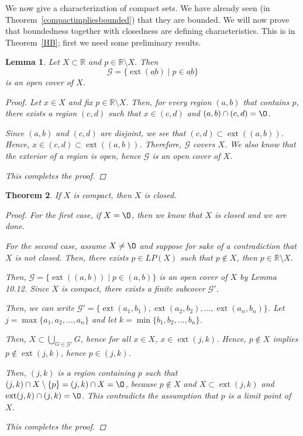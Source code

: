 \documentclass[11pt]{article}
\newcommand{\bbR}{\mathbb{R}}
\renewcommand{\emptyset}{\O}
\renewcommand{\_}[1]{\underline{ #1 }}
\DeclareMathOperator{\ext}{ext}
\newtheorem{theorem}{Theorem}[section]
\newtheorem{lemma}[theorem]{Lemma}
\theoremstyle{definition}
\numberwithin{equation}{subsection}
\begin{document}
  We now give a characterization of compact sets. We have already seen (in Theorem~\ref{compactimpliesbounded}) that they are bounded. We will now prove that boundedness together with closedness are defining characteristics. This is in Theorem~\ref{HB}; first we need some preliminary results. 

\begin{lemma}   Let $X\subset \bbR$ and $p\in \bbR\setminus X.$ Then
\[
\mathcal{G} = \{ \ext(\_{ab}) \mid p\in \_{ab}  \}
\]
is an open cover of $X.$ 

\begin{proof}
Let $x \in X$ and fix $p \in \bbR \setminus X$. Then, for every region $(a,b)$ that contains $p$, there exists a region $(c,d)$ such that $x \in (c,d)$ and $(a,b) \cap (c,d) =\emptyset$. 

Since $(a,b)$ and $(c,d)$ are disjoint, we see that $(c,d) \subset \ext((a,b))$. Hence, $x \in (c,d) \subset \ext((a,b))$. Therefore, $\mathcal{G}$ covers $X$. We also know that the exterior of a region is open, hence $\mathcal{G}$ is an open cover of $X$. 

This completes the proof.



\renewcommand\qedsymbol{QED}
\end{proof}


\end{lemma}



\begin{theorem} \label{compactimpliesclosed} If $X$ is compact, then $X$ is closed.

\begin{proof}
For the first case, if $X = \emptyset$, then we know that $X$ is closed and we are done.

For the second case, assume $X \neq \emptyset$ and suppose for sake of a contradiction that $X$ is not closed. Then, there exists $p \in LP(X)$ such that $p \notin X$, then $p \in \bbR \setminus X$.

Then, $\mathcal{G} = \{ \ext((a,b)) \mid p\in (a,b)  \}$ is an open cover of $X$ by Lemma 10.12. Since $X$ is compact, there exists a finite subcover $\mathcal{G'}$.

Then, we can write $\mathcal{G'}=\{\ext(a_1,b_1), \ext(a_2,b_2), \dots, \ext(a_n,b_n)\}$. Let $j = \max\{a_1, a_2, \dots, a_n\}$ and let $k = \min\{b_1,b_2, \dots, b_n\}$. 

Then, $X \subset \bigcup_{G \in \mathcal{G'}} G$, hence for all $x \in X$, $x \in \ext(j,k)$. Hence, $p \notin X$ implies $p \notin \ext(j,k)$, hence $p \in (j,k)$. 

Then, $(j,k)$ is a region containing $p$ such that $(j,k) \cap X \setminus \{p\} = (j,k) \cap X = \emptyset$, because $p \notin X$ and $X \subset \ext(j,k)$ and $\ext(j,k) \cap (j,k) = \emptyset$. This contradicts the assumption that $p$ is a limit point of $X$.

This completes the proof.


\renewcommand\qedsymbol{QED}
\end{proof}


\end{theorem}
\end{document}
